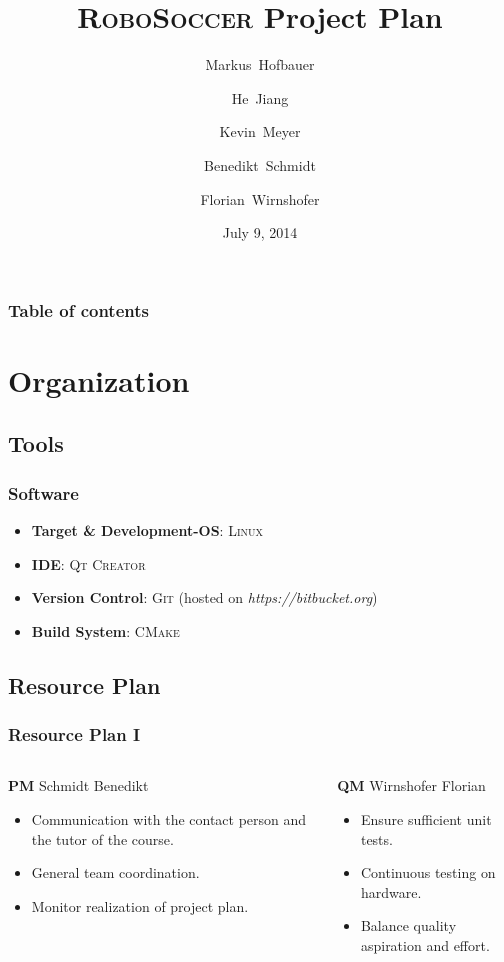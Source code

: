 \documentclass[hyperref={pdfpagelabels=false},compress]{beamer}
\title{\textsc{RoboSoccer} Project Plan}
\author[Hofbauer, Jiang, Meyer, Schmidt, Wirnshofer]{
  Markus~Hofbauer \and
  He~Jiang \and
  Kevin~Meyer \and
  Benedikt~Schmidt \and
  Florian~Wirnshofer
}
\institute
{
	Technische Universität München, Germany
}
\date{July 9, 2014}
\begin{document}
\begin{frame}
	\titlepage
\end{frame}

\begin{frame}
	\frametitle{Table of contents}
	\tableofcontents
\end{frame}

\section{Organization}
\subsection{Tools}
\begin{frame}
	\frametitle{Software}
	\begin{itemize}
		\item  \textbf{Target \& Development-OS}: \textsc{Linux}
		\item  \textbf{IDE}: \textsc{Qt Creator}
		\item  \textbf{Version Control}: \textsc{Git} (hosted on \textit{https://bitbucket.org})
		\item  \textbf{Build System}: \textsc{CMake}
	\end{itemize}
\end{frame}

\subsection{Resource Plan}
\begin{frame}
	\frametitle{Resource Plan I}
	\begin{columns}[t]
		\begin{column}{0.50\textwidth}
			\begin{block}{\textbf{PM} Schmidt Benedikt}
				\begin{itemize}
					\item Communication with the contact person and the tutor of the course.
					\item General team coordination.
					\item Monitor realization of project plan.
				\end{itemize}
			\end{block}
		\end{column}

		\begin{column}{0.50\textwidth}
			\begin{block}{\textbf{QM} Wirnshofer Florian}
				\begin{itemize}
					\item Ensure sufficient unit tests.
					\item Continuous testing on hardware.
					\item Balance quality aspiration and effort.
				\end{itemize}
			\end{block}
		\end{column}
	\end{columns}
\end{frame}
\end{document}
